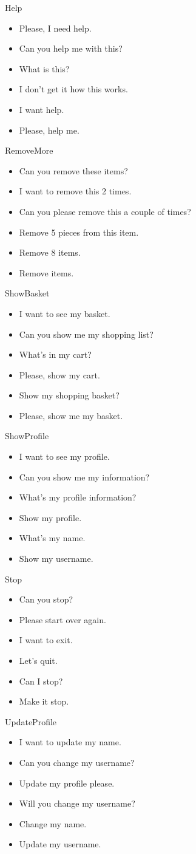 Help
\begin{itemize}
	\item Please, I need help.
	\item Can you help me with this?
	\item What is this?
	\item I don't get it how this works.
	\item I want help.
	\item Please, help me.
\end{itemize}

RemoveMore
\begin{itemize}
	\item Can you remove these items?
	\item I want to remove this 2 times.
	\item Can you please remove this a couple of times?
	\item Remove 5 pieces from this item.
	\item Remove 8 items.
	\item Remove items.
\end{itemize}

ShowBasket
\begin{itemize}
	\item I want to see my basket.
	\item Can you show me my shopping list?
	\item What's in my cart?
	\item Please, show my cart.
	\item Show my shopping basket?
	\item Please, show me my basket.
\end{itemize}

ShowProfile
\begin{itemize}
	\item I want to see my profile.
	\item Can you show me my information?
	\item What's my profile information?
	\item Show my profile.
	\item What's my name.
	\item Show my username.
\end{itemize}

Stop
\begin{itemize}
	\item Can you stop?
	\item Please start over again.
	\item I want to exit.
	\item Let's quit.
	\item Can I stop?
	\item Make it stop.
\end{itemize}

UpdateProfile
\begin{itemize}
	\item I want to update my name.
	\item Can you change my username?
	\item Update my profile please.
	\item Will you change my username?
	\item Change my name.
	\item Update my username.
\end{itemize}